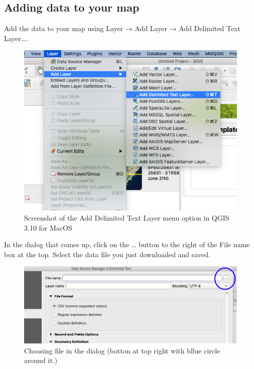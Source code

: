 \documentclass[]{book}
\begin{document}
\hypertarget{adding-data-to-your-map}{%
\subsection{Adding data to your map}\label{adding-data-to-your-map}}

Add the data to your map using Layer → Add Layer → Add Delimited Text Layer\ldots{}.

\begin{figure}
\centering
\includegraphics{images/add_deilmited_text_layer.png}
\caption{Screenshot of the Add Delimited Text Layer menu option in QGIS 3.10 for MacOS}
\end{figure}

In the dialog that comes up, click on the \ldots{} button to the right of the File name box at the top. Select the data file you just downloaded and saved.

\begin{figure}
\centering
\includegraphics{images/add_delimited_file_chooser.png}
\caption{Choosing file in the dialog (botton at top right with bllue circle around it.)}
\end{figure}
\end{document}
